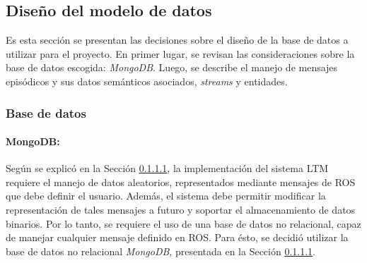 






\subsection{Diseño del modelo de datos}

Es esta sección se presentan las decisiones sobre el diseño de la base de datos a utilizar para el proyecto. En primer lugar, se revisan las consideraciones sobre la base de datos escogida: \textit{MongoDB}. Luego, se describe el manejo de mensajes episódicos y sus datos semánticos asociados, \textit{streams} y entidades.


\subsubsection{Base de datos}

\paragraph{MongoDB:}
Según se explicó en la Sección \ref{}, la implementación del sistema LTM requiere el manejo de datos aleatorios, representados mediante mensajes de ROS que debe definir el usuario. Además, el sistema debe permitir modificar la representación de tales mensajes a futuro y soportar el almacenamiento de datos binarios. Por lo tanto, se requiere el uso de una base de datos no relacional, capaz de manejar cualquier mensaje definido en ROS. Para ésto, se decidió utilizar la base de datos no relacional \textit{MongoDB}, presentada en la Sección \ref{}. 

